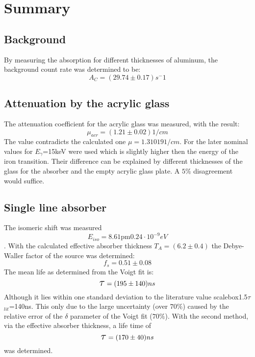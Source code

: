 \section{Summary}
\subsection{Background}
By measuring the absorption for different thicknesses of aluminum, the background count rate was determined to be:
\begin{equation*}
A_C= (29.74\pm0.17)s^-1
\end{equation*}	
\subsection{Attenuation by the acrylic glass}
The attenuation coefficient for the acrylic glass was measured, with the result:
\begin{equation*}
\mu_{acr}=\unit{(1.21\pm0.02)}{1/cm}
\end{equation*}
The value contradicts the calculated one $\mu=\unit{1.31019}{1/cm}$. For the later nominal values for $E_\gamma$=\unit{15}{keV} were used which is slightly higher then the energy of the iron transition. Their difference can be explained by different thicknesses of the glass for the absorber and the empty acrylic glass plate. A $5\%$ disagreement would suffice.
\subsection{Single line absorber}
The isomeric shift was measured
\begin{equation*}
E_{iso}= \unit{8.61\pm0.24\cdot10^{-9}}{eV}
\end{equation*}. 
With the calculated effective absorber thickness $T_A=(6.2\pm0.4)$ the Debye-Waller factor of the source was determined:
\begin{equation*}
f_s=0.51\pm0.08
\end{equation*}
The mean life as determined from the Voigt fit is:
\begin{equation*}
\scalebox{1.5}{$\tau$}=\unit{(195\pm140)}{ns}
\end{equation*}
Although it lies within one standard deviation to the literature value scalebox{1.5}{$\tau$}$_{lit}$=\unit{140}{ns}. This only due to the large uncertainty (over $70\%$) caused by the relative error of the $\delta$ parameter of the Voigt fit ($70\%$). With the second method, via the effective absorber thickness, a life time of
\begin{equation*}
\scalebox{1.5}{$\tau$}= \unit{(170\pm40)}{ns}
\end{equation*}
was determined.
